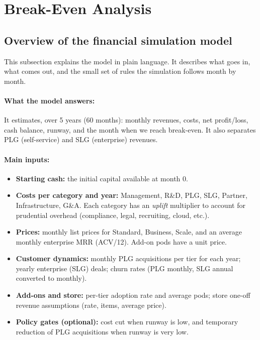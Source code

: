 \section{Break-Even Analysis}
\subsection{Overview of the financial simulation model}
\label{subsec:simple-model}

This subsection explains the model in plain language. It describes what goes in, what comes out, and the small set of rules the simulation follows month by month.

\paragraph{What the model answers:}
It estimates, over 5 years (60 months): monthly revenues, costs, net profit/loss, cash balance, runway, and the month when we reach break-even. It also separates PLG (self-service) and SLG (enterprise) revenues.

\paragraph{Main inputs:}
\begin{itemize}
\item \textbf{Starting cash:} the initial capital available at month 0.
\item \textbf{Costs per category and year:} Management, R\&D, PLG, SLG, Partner, Infrastructure, G\&A. Each category has an \emph{uplift} multiplier to account for prudential overhead (compliance, legal, recruiting, cloud, etc.).
\item \textbf{Prices:} monthly list prices for Standard, Business, Scale, and an average monthly enterprise MRR (ACV/12). Add-on pods have a unit price.
\item \textbf{Customer dynamics:} monthly PLG acquisitions per tier for each year; yearly enterprise (SLG) deals; churn rates (PLG monthly, SLG annual converted to monthly).
\item \textbf{Add-ons and store:} per-tier adoption rate and average pods; store one-off revenue assumptions (rate, items, average price).
\item \textbf{Policy gates (optional):} cost cut when runway is low, and temporary reduction of PLG acquisitions when runway is very low.
\end{itemize}

